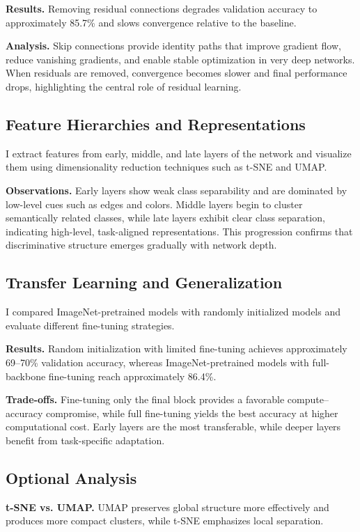 \documentclass{article}
\begin{document}
\textbf{Results.} Removing residual connections degrades validation accuracy to approximately 85.7\% and slows convergence relative to the baseline.

\textbf{Analysis.} Skip connections provide identity paths that improve gradient flow, reduce vanishing gradients, and enable stable optimization in very deep networks. When residuals are removed, convergence becomes slower and final performance drops, highlighting the central role of residual learning.

\subsection{Feature Hierarchies and Representations}
I extract features from early, middle, and late layers of the network and visualize them using dimensionality reduction techniques such as t-SNE and UMAP.

\textbf{Observations.}
Early layers show weak class separability and are dominated by low-level cues such as edges and colors. Middle layers begin to cluster semantically related classes, while late layers exhibit clear class separation, indicating high-level, task-aligned representations. This progression confirms that discriminative structure emerges gradually with network depth.

\subsection{Transfer Learning and Generalization}
I compared ImageNet-pretrained models with randomly initialized models and evaluate different fine-tuning strategies.

\textbf{Results.}
Random initialization with limited fine-tuning achieves approximately 69--70\% validation accuracy, whereas ImageNet-pretrained models with full-backbone fine-tuning reach approximately 86.4\%.

\textbf{Trade-offs.}
Fine-tuning only the final block provides a favorable compute--accuracy compromise, while full fine-tuning yields the best accuracy at higher computational cost. Early layers are the most transferable, while deeper layers benefit from task-specific adaptation.

\subsection{Optional Analysis}
\textbf{t-SNE vs. UMAP.}
UMAP preserves global structure more effectively and produces more compact clusters, while t-SNE emphasizes local separation.
\end{document}
